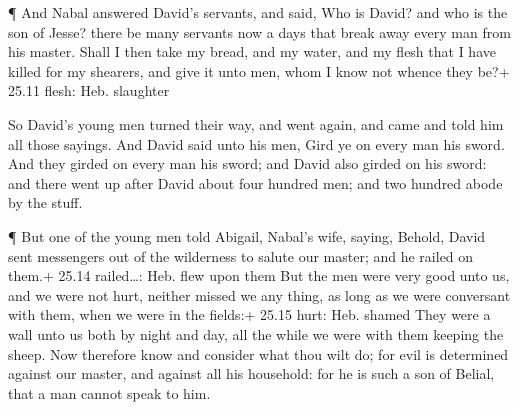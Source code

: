  ¶ And Nabal answered David's servants, and said, Who is
David? and who is the son of Jesse? there be many servants now a days
that break away every man from his master.  Shall I then
take my bread, and my water, and my flesh that I have killed for my
shearers, and give it unto men, whom I know not whence they be?+ 25.11
flesh: Heb. slaughter

 So David's young men turned their way, and went again, and
came and told him all those sayings.  And David said unto
his men, Gird ye on every man his sword. And they girded on every man
his sword; and David also girded on his sword: and there went up after
David about four hundred men; and two hundred abode by the stuff.

 ¶ But one of the young men told Abigail, Nabal's wife,
saying, Behold, David sent messengers out of the wilderness to salute
our master; and he railed on them.+ 25.14 railed\ldots: Heb. flew upon
them  But the men were very good unto us, and we were not
hurt, neither missed we any thing, as long as we were conversant with
them, when we were in the fields:+ 25.15 hurt: Heb. shamed 
They were a wall unto us both by night and day, all the while we were
with them keeping the sheep.  Now therefore know and
consider what thou wilt do; for evil is determined against our master,
and against all his household: for he is such a son of Belial, that a
man cannot speak to him.

